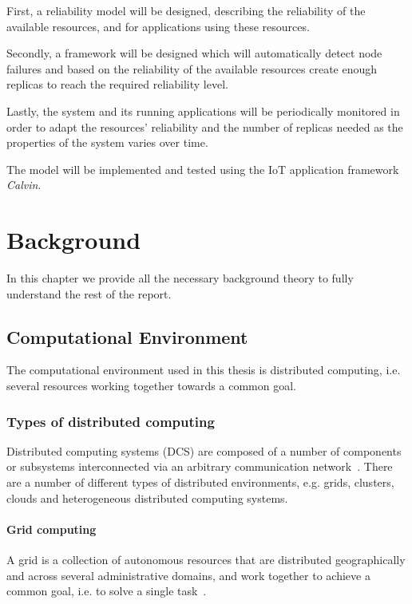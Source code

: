 \documentclass{cslthse-msc}
\begin{document}
First, a reliability model will be designed, describing the reliability of the available resources, and for applications using these resources.

Secondly, a framework will be designed which will automatically detect node failures and based on the reliability of the available resources create enough replicas to reach the required reliability level.

Lastly, the system and its running applications will be periodically monitored in order to adapt the resources' reliability and the number of replicas needed as the properties of the system varies over time.

The model will be implemented and tested using the IoT application framework \emph{Calvin}.

\chapter{Background} \label{ch:background}
In this chapter we provide all the necessary background theory to fully understand the rest of the report.
\section{Computational Environment} \label{sec:background_comp_env}
The computational environment used in this thesis is distributed computing, i.e. several resources working together towards a common goal.

\subsection{Types of distributed computing} \label{subsec:background_types_of_distr_comp}
Distributed computing systems (DCS) are composed of a number of components or subsystems interconnected via an arbitrary communication network~\cite{relModelDistSimSystem, efficientRelAnalysisAlgo}. There are a number of different types of distributed environments, e.g. grids, clusters, clouds and heterogeneous distributed computing systems.

\subsubsection{Grid computing}
A grid is a collection of autonomous resources that are distributed geographically and across several administrative domains, and work together to achieve a common goal, i.e. to solve a single task~\cite{compStudyLoadAndCloud, relAndPerfGridServices, evalOfGridRel}.
\end{document}
